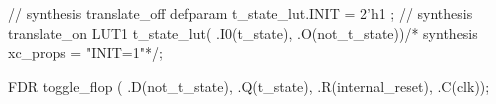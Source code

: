\begin{vcode}
 // synthesis translate_off 
 defparam t_state_lut.INIT = 2'h1 ;
 // synthesis translate_on 
 LUT1 t_state_lut( 
 .I0(t_state),
 .O(not_t_state))/* synthesis xc_props = "INIT=1"*/;

 FDR toggle_flop ( 
 .D(not_t_state),
 .Q(t_state),
 .R(internal_reset),
 .C(clk));
\end{vcode}

